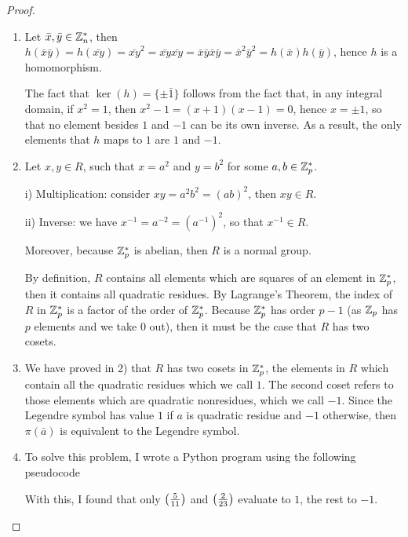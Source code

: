\begin{proof}
 \begin{enumerate}
     \item Let $\bar{x},\bar{y}\in\mathbb{Z}^{*}_{n}$, then $h(\bar{x}\bar{y})= h(\bar{xy})= \bar{xy}^{2}= \bar{xy}\bar{xy}= \bar{x}\bar{y}\bar{x}\bar{y}= \bar{x}^{2}\bar{y}^{2}= h(\bar{x})h(\bar{y})$, hence $h$ is a homomorphism.

     The fact that $\ker(h)=\{\pm\bar{1}\}$ follows from the fact that, in any integral domain, if $x^{2}=1$, then $x^{2}-1=(x+1)(x-1)=0$, hence $x=\pm1$, so that no element besides $1$ and $-1$ can be its own inverse. As a result, the only elements that $h$ maps to $1$ are $1$ and $-1$.
     \item Let $x,y\in R$, such that $x=a^{2}$ and $y=b^{2}$ for some $a,b\in \mathbb{Z}^{*}_{p}$.

     i) Multiplication: consider $xy=a^{2}b^{2}=(ab)^{2}$, then $xy\in R$.

     ii) Inverse: we have $x^{-1}=a^{-2}=(a^{-1})^{2}$, so that $x^{-1}\in R$.

     Moreover, because $\mathbb{Z}^{*}_{p}$ is abelian, then $R$ is a normal group.

     By definition, $R$ contains all elements which are squares of an element in $\mathbb{Z}^{*}_{p}$, then it contains all quadratic residues. By Lagrange's Theorem, the index of $R$ in $\mathbb{Z}^{*}_{p}$ is a factor of the order of $\mathbb{Z}^{*}_{p}$. Because $\mathbb{Z}^{*}_{p}$ has order $p-1$ (as $\mathbb{Z}_{p}$ has $p$ elements and we take $0$ out), then it must be the case that $R$ has two cosets.
     \item We have proved in 2) that $R$ has two cosets in $\mathbb{Z}^{*}_{p}$, the elements in $R$ which contain all the quadratic residues which we call $1$. The second coset refers to those elements which are quadratic nonresidues, which we call $-1$. Since the Legendre symbol has value $1$ if $a$ is quadratic residue and $-1$ otherwise, then $\pi(\bar{a})$ is equivalent to the Legendre symbol.  
     \item To solve this problem, I wrote a Python program using the following pseudocode
     \begin{algorithmic}
        \ENDFOR
    \end{algorithmic}
    With this, I found that only $\left( \frac{5}{11}\right)$ and $\left( \frac{2}{23}\right)$ evaluate to $1$, the rest to $-1$. 


\end{enumerate}
\end{proof}
